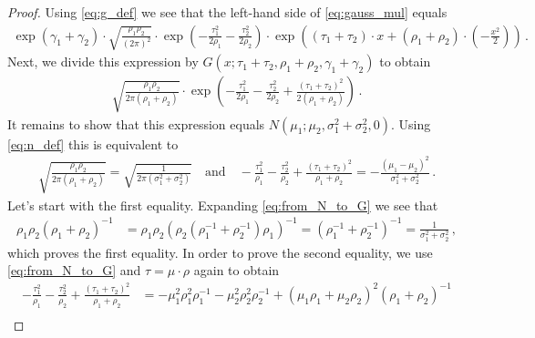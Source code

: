 \documentclass[a4paper]{article}
\begin{document}
\begin{proof}
    Using \eqref{eq:g_def} we see that the left-hand side of \eqref{eq:gauss_mul} equals
    \begin{align*}
        \exp(\gamma_1+\gamma_2)\cdot \sqrt{\frac{\rho_1\rho_2}{(2\pi)^2}} \cdot \exp\left(-\frac{\tau_1^2}{2\rho_1}-\frac{\tau^2_2}{2\rho_2}\right) \cdot \exp\left(\left(\tau_1 + \tau_2\right) \cdot x + \left(\rho_1 + \rho_2\right) \cdot \left(-\frac{x^2}{2}\right)\right)\,.
    \end{align*}
    Next, we divide this expression by $G(x;\tau_1 + \tau_2,\rho_1 + \rho_2,\gamma_1+\gamma_2)$ to obtain
    \begin{align*}
        \sqrt{\frac{\rho_1\rho_2}{2\pi(\rho_1+\rho_2)}} \cdot \exp\left(-\frac{\tau_1^2}{2\rho_1}-\frac{\tau^2_2}{2\rho_2}+\frac{\left(\tau_1+\tau_2\right)^2}{2(\rho_1+\rho_2)}\right) \,.
    \end{align*}
    It remains to show that this expression equals $N\left(\mu_1;\mu_2,\sigma_1^2+\sigma_2^2,0\right)$. Using \eqref{eq:n_def} this is equivalent to
    \begin{align*}
        \sqrt{\frac{\rho_1\rho_2}{2\pi(\rho_1+\rho_2)}} = \sqrt{\frac{1}{2\pi\left(\sigma^2_1+\sigma^2_2\right)}}\quad\mbox{and} \quad
        -\frac{\tau_1^2}{\rho_1}-\frac{\tau^2_2}{\rho_2}+\frac{\left(\tau_1+\tau_2\right)^2}{\rho_1+\rho_2} = -\frac{(\mu_1 - \mu_2)^2}{\sigma_1^2+\sigma_2^2}\,.
    \end{align*}
    Let's start with the first equality. Expanding \eqref{eq:from_N_to_G} we see that
    \begin{align*}
        \rho_1\rho_2\left(\rho_1+\rho_2\right)^{-1} & = \rho_1\rho_2\left(\rho_2\left(\rho_1^{-1}+\rho_2^{-1}\right)\rho_1\right)^{-1} = \left(\rho_1^{-1}+\rho_2^{-1}\right)^{-1} = \frac{1}{\sigma_1^2 + \sigma_2^2} \,,
    \end{align*}
    which proves the first equality. In order to prove the second equality, we use \eqref{eq:from_N_to_G} and $\tau = \mu\cdot\rho$ again to obtain
    \begin{align*}
        -\frac{\tau_1^2}{\rho_1}-\frac{\tau^2_2}{\rho_2}+\frac{\left(\tau_1+\tau_2\right)^2}{\rho_1+\rho_2} & =
        -\mu_1^2\rho_1^2\rho_1^{-1} -\mu_2^2\rho_2^2\rho_2^{-1} + \left(\mu_1\rho_1+\mu_2\rho_2\right)^2\left(\rho_1+\rho_2\right)^{-1}                                                                                                                                                                                                            \\

\end{align*}
\end{proof}
\end{document}
